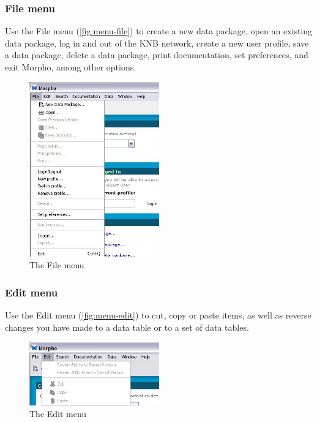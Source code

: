 \subsubsection{File menu} \label{sec:menu-file}

Use the File menu (\autoref{fig:menu-file}) to create a new data
package, open an existing data package, log in and out of the KNB
network, create a new user profile, save a data package, delete a data
package, print documentation, set preferences, and exit Morpho, among
other options. 

\begin{figure}
  \centering
    \includegraphics[width=0.5\textwidth]{images/menu-file.jpg}
  \caption{The File menu}
  \label{fig:menu-file}
\end{figure}

\subsubsection{Edit menu} \label{sec:menu-edit}

Use the Edit menu (\autoref{fig:menu-edit}) to cut, copy or paste items,
as well as reverse changes you have made to a data table or to a set of
data tables.

\begin{figure}
  \centering
    \includegraphics[width=0.5\textwidth]{images/menu-edit.jpg}
  \caption{The Edit menu}
  \label{fig:menu-edit}
\end{figure}

